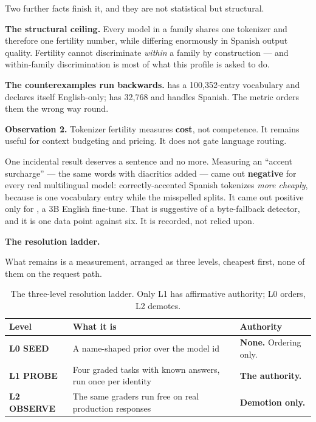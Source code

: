 Two further facts finish it, and they are not statistical but structural.

\textbf{The structural ceiling.} Every model in a family shares one tokenizer
and therefore one fertility number, while differing enormously in Spanish output
quality. Fertility cannot discriminate \emph{within} a family by construction
--- and within-family discrimination is most of what this profile is asked to
do.

\textbf{The counterexamples run backwards.}  has a
100{,}352-entry vocabulary and declares itself English-only;
 has 32{,}768 and handles Spanish. The metric orders them
the wrong way round.

\begin{keyinsight}
\textbf{Observation 2.} Tokenizer fertility measures \textbf{cost}, not
competence. It remains useful for context budgeting and pricing. It does not
gate language routing.
\end{keyinsight}

One incidental result deserves a sentence and no more. Measuring an ``accent
surcharge'' --- the same words with diacritics added --- came out
\textbf{negative} for every real multilingual model: correctly-accented Spanish
tokenizes \emph{more cheaply}, because  is one vocabulary entry
while the misspelled  splits. It came out positive only for
, a 3B English fine-tune. That is suggestive of a byte-fallback
detector, and it is one data point against six. It is recorded, not relied upon.

\textbf{The resolution ladder.}

What remains is a measurement, arranged as three levels, cheapest first, none of
them on the request path.

\begin{table}[htbp]
\centering
\footnotesize
\caption{The three-level resolution ladder. Only L1 has affirmative authority;
L0 orders, L2 demotes.}
\label{tab:resolution-ladder}
\begin{tabular}{@{}>{\raggedright\arraybackslash}p{}
                  >{\raggedright\arraybackslash}p{}
                  >{\raggedright\arraybackslash}p{}@{}}
\toprule
\textbf{Level} & \textbf{What it is} & \textbf{Authority} \\
\midrule
\textbf{L0 \textperiodcentered{} SEED} &
  A name-shaped prior over the model id &
  \textbf{None.} Ordering only. \\
\addlinespace[2pt]
\textbf{L1 \textperiodcentered{} PROBE} &
  Four graded tasks with known answers, run once per identity &
  \textbf{The authority.} \\
\addlinespace[2pt]
\textbf{L2 \textperiodcentered{} OBSERVE} &
  The same graders run free on real production responses &
  \textbf{Demotion only.} \\
\bottomrule
\end{tabular}
\end{table}

